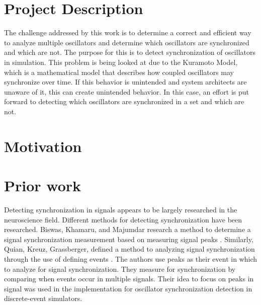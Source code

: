 \documentclass{article}
\begin{document}
\section{Project Description} %

The challenge addressed by this work is to determine a correct and efficient way to analyze multiple oscillators and determine which oscillators are synchronized and which are not. The purpose for this is to detect synchronization of oscillators in simulation. This problem is being looked at due to the Kuramoto Model, which is a mathematical model that describes how coupled oscillators may synchronize over time. If this behavior is unintended and system architects are unaware of it, this can create unintended behavior. In this case, an effort is put forward to detecting which oscillators are synchronized in a set and which are not.


\section{Motivation} %


\section{Prior work} %
Detecting synchronization in signals appears to be largely researched in the neuroscience field. Different methods for detecting synchronization have been researched. Biswas, Khamaru, and Majumdar research a method to determine a signal synchronization measurement based on measuring signal peaks \cite{biswas_2014}. Similarly, Quian, Kreuz, Grassberger, defined a method to analyzing signal synchronization through the use of defining events \cite{quian_2002}. The authors use peaks as their event in which to analyze for signal synchronization. They measure for synchronization by comparing when events occur in multiple signals. Their idea to focus on peaks in signal was used in the implementation for oscillator synchronization detection in discrete-event simulators.
\end{document}
